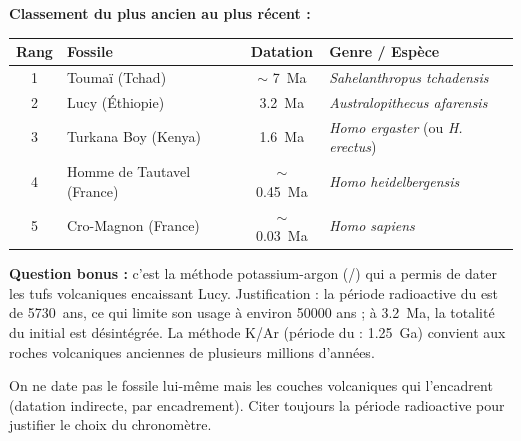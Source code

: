 \documentclass[11pt]{article}
\newcommand{\cle}[1]{{\popxbold\color{popdark}#1}}
\begin{document}
\begin{corrige}
\textbf{Classement du plus ancien au plus récent :}
\begin{center}
\begin{tabularx}{\linewidth}{|c|X|c|X|}\hline
\textbf{Rang} & \textbf{Fossile} & \textbf{Datation} & \textbf{Genre / Espèce} \\ \hline
1 & Toumaï (Tchad) & $\sim$ \SI{7}{Ma} & \emph{Sahelanthropus tchadensis} \\ \hline
2 & Lucy (Éthiopie) & \SI{3,2}{Ma} & \emph{Australopithecus afarensis} \\ \hline
3 & Turkana Boy (Kenya) & \SI{1,6}{Ma} & \emph{Homo ergaster} (ou \emph{H. erectus}) \\ \hline
4 & Homme de Tautavel (France) & $\sim$ \SI{0,45}{Ma} & \emph{Homo heidelbergensis} \\ \hline
5 & Cro-Magnon (France) & $\sim$ \SI{0,03}{Ma} & \emph{Homo sapiens} \\ \hline
\end{tabularx}
\end{center}
\textbf{Question bonus :} c'est la méthode \cle{potassium-argon} (/) qui a permis de dater les tufs volcaniques encaissant Lucy. Justification : la période radioactive du  est de \SI{5730}{ans}, ce qui limite son usage à environ \num{50000} ans ; à \SI{3,2}{Ma}, la totalité du  initial est désintégrée. La méthode K/Ar (période du  : \SI{1,25}{Ga}) convient aux roches volcaniques anciennes de plusieurs millions d'années.
\end{corrige}

\begin{attention}
On ne date pas le fossile lui-même mais les couches volcaniques qui l'encadrent (datation indirecte, par encadrement). Citer toujours la période radioactive pour justifier le choix du chronomètre.
\end{attention}
\end{document}
